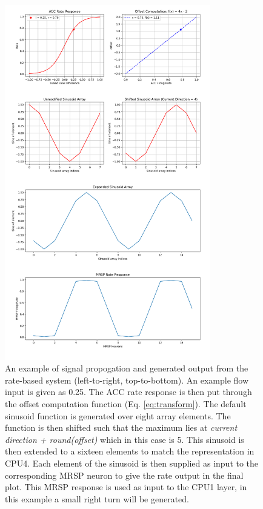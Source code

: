 \documentclass[a4paper,11pt,twoside,openright]{article}
\begin{document}
\begin{figure}[h!]
  \centering
  \vspace{-35pt}
  \includegraphics[width=0.8\textwidth]{NeuralCASignalProp}
  \caption{\label{fig:mrspRateResponse} An example of signal
    propogation and generated output from the rate-based system
    (left-to-right, top-to-bottom). An example flow input is given as
    0.25. The ACC rate response is then put through the offset computation
    function (Eq. \ref{eq:transform}). The default sinusoid function
    is generated over eight array elements. The function is then
    shifted such that the maximum lies at \textit{current\textunderscore
    direction + round(offset)} which in this case is 5. This sinusoid
    is then extended to a sixteen elements to match the representation
    in CPU4. Each element of the sinusoid is then supplied as input to
    the corresponding MRSP neuron to give the rate output in the final
    plot. This MRSP response is used as input to the CPU1 layer, in
    this example a small right turn will be generated.
  }
\end{figure}
\end{document}
